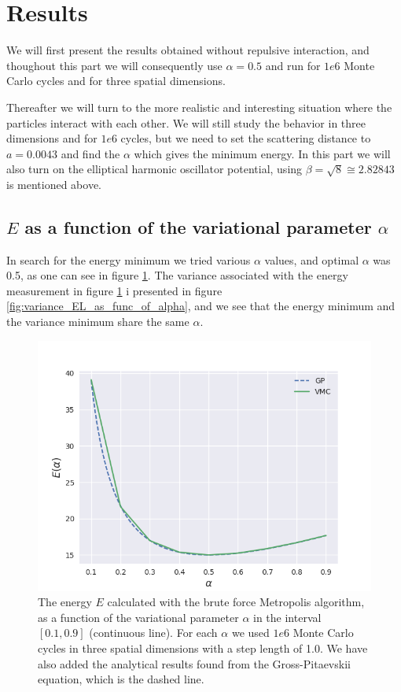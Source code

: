 \documentclass[norsk,a4paper,12pt]{article}
\begin{document}
\section{Results} \label{Results}

We will first present the results obtained without repulsive interaction, and thoughout this part we will consequently use $\alpha=0.5$ and run for $1e6$ Monte Carlo cycles and for three spatial dimensions. 

Thereafter we will turn to the more realistic and interesting situation where the particles interact with each other. We will still study the behavior in three dimensions and for $1e6$ cycles, but we need to set the scattering distance to $a=0.0043$ and find the $\alpha$ which gives the minimum energy. In this part we will also turn on the elliptical harmonic oscillator potential, using $\beta=\sqrt{8}\cong2.82843$ is mentioned above.

\subsection{$E$ as a function of the variational parameter $\alpha$}
In search for the energy minimum we tried various $\alpha$ values, and optimal $\alpha$ was 0.5, as one can see in figure \ref{fig:EL_as_func_of_alpha}. The variance associated with the energy measurement in figure \ref{fig:EL_as_func_of_alpha} i presented in figure \ref{fig:variance_EL_as_func_of_alpha}, and we see that the energy minimum and the variance minimum share the same $\alpha$.

\begin{figure} [H]
	\centering
	\includegraphics[scale=0.6]{images/energy.png}
	\caption{The energy $E$ calculated with the brute force Metropolis algorithm, as a function of the variational parameter $\alpha$ in the interval $[0.1,0.9]$ (continuous line). For each $\alpha$ we used $1e6$ Monte Carlo cycles in three spatial dimensions with a step length of 1.0. We have also added the analytical results found from the Gross-Pitaevskii equation, which is the dashed line.}
	\label{fig:EL_as_func_of_alpha}
\end{figure} 
\end{document}
